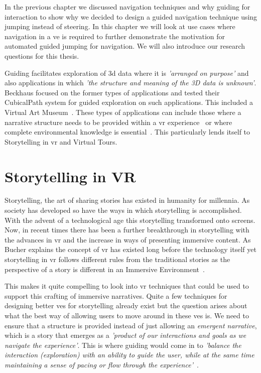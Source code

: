 \label{Chapter:Guided Jumping Motivation}
In the previous chapter we discussed navigation techniques and why guiding for interaction to show why we decided to design a guided navigation technique using jumping instead of steering. In this chapter we will look at use cases where navigation in a \acrshort{ve} is required to further demonstrate the motivation for automated guided jumping for navigation. We will also introduce our research questions for this thesis. 

Guiding facilitates exploration of \acrshort{3d} data where it is \textit{'arranged on purpose'} and also applications in which \textit{'the structure and meaning of the 3D data is unknown'}. Beckhaus focused on the former types of applications and tested their CubicalPath system for guided exploration on such applications. This included a Virtual Art Museum~\cite{Beckhaus2002}. These types of applications can include those where a narrative structure needs to be provided within a \acrshort{vr} experience~\cite{Galyean1995} or where complete environmental knowledge is essential~\cite{Freitag2018}. This particularly lends itself to Storytelling in \acrshort{vr} and Virtual Tours. 

\section{Storytelling in VR}
\label{section GJM: Storytelling in VR}
Storytelling, the art of sharing stories has existed in humanity for millennia. As society has developed so have the ways in which storytelling is accomplished. With the advent of a technological age this storytelling transformed onto screens. Now, in recent times there has been a further breakthrough in storytelling with the advances in \acrshort{vr} and the increase in ways of presenting immersive content. As Bucher explains the concept of \acrshort{vr} has existed long before the technology itself yet storytelling in \acrshort{vr} follows different rules from the traditional stories as the perspective of a story is different in an Immersive Environment~\cite{Bucher2017}.

This makes it quite compelling to look into \acrshort{vr} techniques that could be used to support this crafting of immersive narratives. Quite a few techniques for designing better \acrshort{ve}s for storytelling already exist but the question arises about what the best way of allowing users to move around in these \acrshort{ve}s is. We need to ensure that a structure is provided instead of just allowing an \textit{emergent narrative}, which is a story that emerges as a \textit{'product of our interactions and goals as we navigate the experience'}. This is where guiding would come in to \textit{'balance the interaction (exploration) with an ability to guide the user, while at the same time maintaining a sense of pacing or flow through the experience'}~\cite{Galyean1995}.

